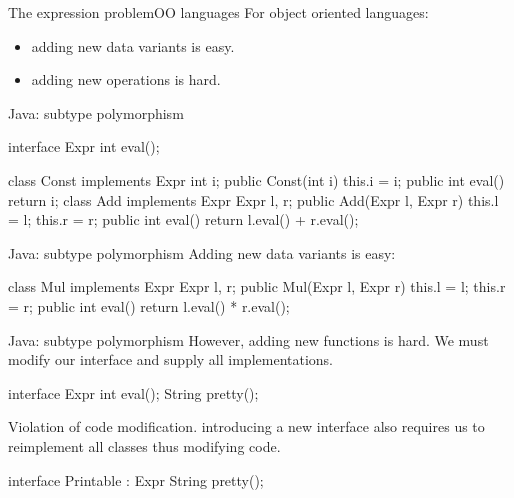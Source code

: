 \documentclass[10pt, compress]{beamer}
\newenvironment{slide}[1]{\begin{frame}[fragile,environment=slide]{#1}}{\end{frame}}
\newenvironment{slide}[2]{\begin{frame}[fragile,environment=slide]{#1}{#2}}{\end{frame}}
\begin{document}
\begin{slide}{The expression problem}{OO languages}
For object oriented languages:
\begin{itemize}
\item adding new data variants is easy.
\item adding new operations is hard.
\end{itemize}
\end{slide}


\begin{slide}{Java: subtype polymorphism}
\begin{java}
interface Expr {
  int eval();
}
\end{java}

\begin{java}
class Const implements Expr {
  int i;
  public Const(int i) { this.i = i; }
  public int eval() { return i; }
}
class Add implements Expr {
  Expr l, r;
  public Add(Expr l, Expr r) { this.l = l; this.r = r; }
  public int eval() { 
    return l.eval() + r.eval();
  }
}
\end{java}
\end{slide}


\begin{slide}{Java: subtype polymorphism}
Adding new data variants is easy:
\begin{java}
class Mul implements Expr {
  Expr l, r;
  public Mul(Expr l, Expr r) { this.l = l; this.r = r; }
  public int eval() {
    return l.eval() * r.eval();
  }
}
\end{java}
\end{slide}


\begin{slide}{Java: subtype polymorphism}
However, adding new functions is hard. We must modify our interface and supply all implementations.
\begin{java}
interface Expr {
  int eval();
  String pretty();
}
\end{java}
Violation of code modification.
introducing a new interface also requires us to reimplement all classes thus modifying code.
\begin{java}
interface Printable : Expr {
  String pretty();
}
\end{java}
\end{slide}
\end{document}
